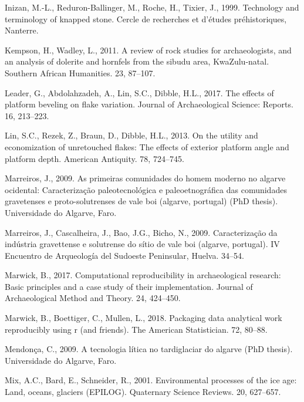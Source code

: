\documentclass[12pt,twoside]{reedthesis}
\begin{document}
\leavevmode\hypertarget{ref-inizan1999}{}%
Inizan, M.-L., Reduron-Ballinger, M., Roche, H., Tixier, J., 1999. Technology and terminology of knapped stone. Cercle de recherches et d'études préhistoriques, Nanterre.

\leavevmode\hypertarget{ref-kempson2011}{}%
Kempson, H., Wadley, L., 2011. A review of rock studies for archaeologists, and an analysis of dolerite and hornfels from the sibudu area, KwaZulu-natal. Southern African Humanities. 23, 87--107.

\leavevmode\hypertarget{ref-leader2017}{}%
Leader, G., Abdolahzadeh, A., Lin, S.C., Dibble, H.L., 2017. The effects of platform beveling on flake variation. Journal of Archaeological Science: Reports. 16, 213--223.

\leavevmode\hypertarget{ref-linetal2013}{}%
Lin, S.C., Rezek, Z., Braun, D., Dibble, H.L., 2013. On the utility and economization of unretouched flakes: The effects of exterior platform angle and platform depth. American Antiquity. 78, 724--745.

\leavevmode\hypertarget{ref-marreiros2009}{}%
Marreiros, J., 2009. As primeiras comunidades do homem moderno no algarve ocidental: Caracterização paleotecnológica e paleoetnográfica das comunidades gravetenses e proto-solutrenses de vale boi (algarve, portugal) (PhD thesis). Universidade do Algarve, Faro.

\leavevmode\hypertarget{ref-marreirosetal2009}{}%
Marreiros, J., Cascalheira, J., Bao, J.G., Bicho, N., 2009. Caracterização da indústria gravettense e solutrense do sítio de vale boi (algarve, portugal). IV Encuentro de Arqueología del Sudoeste Peninsular, Huelva. 34--54.

\leavevmode\hypertarget{ref-marwick2017}{}%
Marwick, B., 2017. Computational reproducibility in archaeological research: Basic principles and a case study of their implementation. Journal of Archaeological Method and Theory. 24, 424--450.

\leavevmode\hypertarget{ref-marwick2018}{}%
Marwick, B., Boettiger, C., Mullen, L., 2018. Packaging data analytical work reproducibly using r (and friends). The American Statistician. 72, 80--88.

\leavevmode\hypertarget{ref-mendonca2009}{}%
Mendonça, C., 2009. A tecnologia lítica no tardiglaciar do algarve (PhD thesis). Universidade do Algarve, Faro.

\leavevmode\hypertarget{ref-mix2001}{}%
Mix, A.C., Bard, E., Schneider, R., 2001. Environmental processes of the ice age: Land, oceans, glaciers (EPILOG). Quaternary Science Reviews. 20, 627--657.
\end{document}
